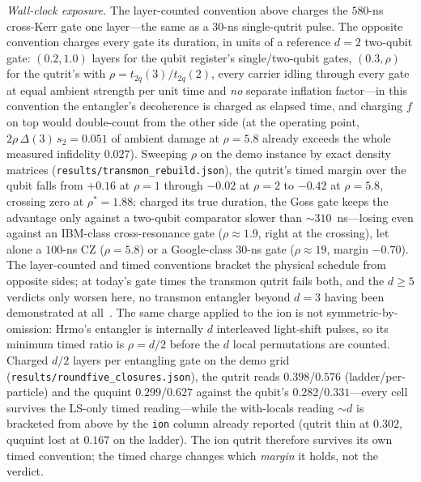 \documentclass[aps,pra,reprint,superscriptaddress,nofootinbib,floatfix]{revtex4-2}
\begin{document}
\emph{Wall-clock exposure.} The layer-counted convention above
charges the $580$-ns cross-Kerr gate one layer---the same as a
$30$-ns single-qutrit pulse. The opposite convention charges every
gate its duration, in units of a reference $d=2$ two-qubit gate:
$(0.2,1.0)$ layers for the qubit register's single/two-qubit gates,
$(0.3,\rho)$ for the qutrit's with $\rho=t_{2q}(3)/t_{2q}(2)$,
every carrier idling through every gate at equal ambient strength
per unit time and \emph{no} separate inflation factor---in this
convention the entangler's decoherence is charged as elapsed time,
and charging $f$ on top would double-count from the other side
(at the operating point, $2\rho\,\Delta(3)\,s_2=0.051$ of ambient
damage at $\rho=5.8$ already exceeds the whole measured infidelity
$0.027$). Sweeping $\rho$ on the demo instance by exact density
matrices (\texttt{results/transmon\_rebuild.json}), the qutrit's
timed margin over the qubit falls from $+0.16$ at $\rho=1$ through
$-0.02$ at $\rho=2$ to $-0.42$ at $\rho=5.8$, crossing zero at
$\rho^\ast=1.88$: charged its true duration, the Goss gate keeps the
advantage only against a two-qubit comparator slower than
${\sim}310$~ns---losing even against an IBM-class cross-resonance
gate ($\rho\approx1.9$, right at the crossing), let alone a
$100$-ns CZ ($\rho=5.8$) or a
Google-class $30$-ns gate ($\rho\approx19$, margin $-0.70$). The
layer-counted and timed conventions bracket the physical schedule
from opposite sides; at today's gate times the transmon qutrit
fails both, and the $d\ge5$ verdicts only worsen here, no transmon
entangler beyond $d=3$ having been demonstrated at
all~\cite{goss2022}. The same charge applied to the ion is not
symmetric-by-omission: Hrmo's entangler is internally $d$
interleaved light-shift pulses, so its minimum timed ratio is
$\rho=d/2$ before the $d$ local permutations are counted. Charged
$d/2$ layers per entangling gate on the demo grid
(\texttt{results/roundfive\_closures.json}), the qutrit reads
$0.398$/$0.576$ (ladder/per-particle) and the ququint
$0.299$/$0.627$ against the qubit's $0.282$/$0.331$---every cell
survives the LS-only timed reading---while the with-locals reading
${\sim}d$ is bracketed from above by the \texttt{ion} column
already reported (qutrit thin at $0.302$, ququint lost at $0.167$
on the ladder). The ion qutrit therefore survives its own timed
convention; the timed charge changes which \emph{margin} it holds,
not the verdict.
\end{document}
